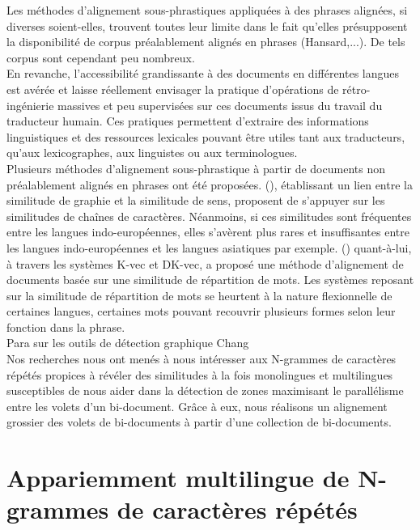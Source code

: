 \documentclass[10pt,a4paper,twoside]{article}
\begin{document}
Les méthodes d'alignement sous-phrastiques appliquées à des phrases alignées, si diverses soient-elles, trouvent toutes leur limite dans le fait qu'elles présupposent la disponibilité de corpus préalablement alignés en phrases (Hansard,...). De tels corpus sont cependant peu nombreux.\\
En revanche, l’accessibilité grandissante à des documents en différentes langues est avérée et laisse réellement envisager la pratique d’opérations de rétro-ingénierie massives et peu supervisées sur ces documents issus du travail du traducteur humain. Ces pratiques permettent d’extraire des informations linguistiques et des ressources lexicales pouvant être utiles tant aux traducteurs, qu’aux lexicographes, aux linguistes ou aux terminologues.\\
Plusieurs méthodes d'alignement sous-phrastique à partir de documents non préalablement alignés en phrases ont été proposées. (\citealp{simard_using_1993,church_char_align:_1993,church_dotplot:_1993,dagan_robust_1993}), établissant un lien entre la similitude de graphie et la similitude de sens, proposent de s'appuyer sur les similitudes de chaînes de caractères. Néanmoins, si ces similitudes sont fréquentes entre les langues indo-européennes, elles s'avèrent plus rares et insuffisantes entre les langues indo-européennes et les langues asiatiques par exemple. (\citealp{fung_k-vec:_1994,fung_aligning_1994}) quant-à-lui, à travers les systèmes K-vec et DK-vec, a proposé une méthode d'alignement de documents basée sur une similitude de répartition de mots. Les systèmes reposant sur la similitude de répartition de mots se heurtent à la nature flexionnelle de certaines langues, certaines mots pouvant recouvrir plusieurs formes selon leur fonction dans la phrase.\\

Para sur les outils de détection graphique  Chang \citep{chang_alignment_1997}\\

Nos recherches nous ont menés à nous intéresser aux N-grammes de caractères répétés propices à révéler des similitudes à la fois monolingues et multilingues susceptibles de nous aider dans la détection de zones maximisant le parallélisme entre les volets d'un bi-document. Grâce à eux, nous réalisons un alignement grossier des volets de bi-documents à partir d'une collection de bi-documents.

\section{Appariemment multilingue de N-grammes de caractères répétés}
\end{document}
